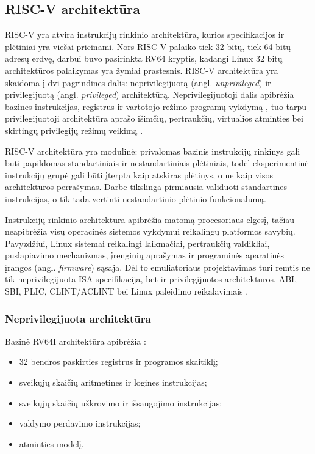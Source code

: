 \subsection{RISC-V architektūra}

RISC-V yra atvira instrukcijų rinkinio architektūra, kurios specifikacijos ir plėtiniai yra viešai prieinami. Nors RISC-V palaiko tiek 32 bitų, tiek 64 bitų adresų erdvę, darbui buvo pasirinkta RV64 kryptis, kadangi Linux 32 bitų architektūros palaikymas yra žymiai prastesnis. RISC-V architektūra yra skaidoma į dvi pagrindines dalis: neprivilegijuotą (angl. \textit{unprivileged}) ir privilegijuotą (angl. \textit{privileged}) architektūrą. Neprivilegijuotoji dalis apibrėžia bazines instrukcijas, registrus ir vartotojo režimo programų vykdymą \cite[p.~23]{riscv-unprivileged-20260120}, tuo tarpu privilegijuotoji architektūra aprašo išimčių, pertraukčių, virtualios atminties bei skirtingų privilegijų režimų veikimą \cite[p.~10--13]{riscv-privileged-20260120}.

RISC-V architektūra yra modulinė: privalomas bazinis instrukcijų rinkinys gali būti papildomas standartiniais ir nestandartiniais plėtiniais, todėl eksperimentinė instrukcijų grupė gali būti įterpta kaip atskiras plėtinys, o ne kaip visos architektūros perrašymas. Darbe tikslinga pirmiausia validuoti standartines instrukcijas, o tik tada vertinti nestandartinio plėtinio funkcionalumą.

Instrukcijų rinkinio architektūra apibrėžia matomą procesoriaus elgesį, tačiau neapibrėžia visų operacinės sistemos vykdymui reikalingų platformos savybių. Pavyzdžiui, Linux sistemai reikalingi laikmačiai, pertraukčių valdikliai, puslapiavimo mechanizmas, įrenginių aprašymas ir programinės aparatinės įrangos (angl. \textit{firmware}) sąsaja. Dėl to emuliatoriaus projektavimas turi remtis ne tik neprivilegijuota ISA specifikacija, bet ir privilegijuotos architektūros, ABI, SBI, PLIC, CLINT/ACLINT bei Linux paleidimo reikalavimais \cite{riscv-psabi}\cite{riscv-sbi-doc}\cite{riscv-plic-1.0.0}\cite{riscv-aclint-1.0}\cite{linux-riscv-boot}.

\subsubsection{Neprivilegijuota architektūra}

Bazinė RV64I architektūra apibrėžia \cite[p.~23,~41]{riscv-unprivileged-20260120}:
\begin{itemize}
\item 32 bendros paskirties registrus ir programos skaitiklį;
\item sveikųjų skaičių aritmetines ir logines instrukcijas;
\item sveikųjų skaičių užkrovimo ir išsaugojimo instrukcijas;
\item valdymo perdavimo instrukcijas;
\item atminties modelį.
\end{itemize}

